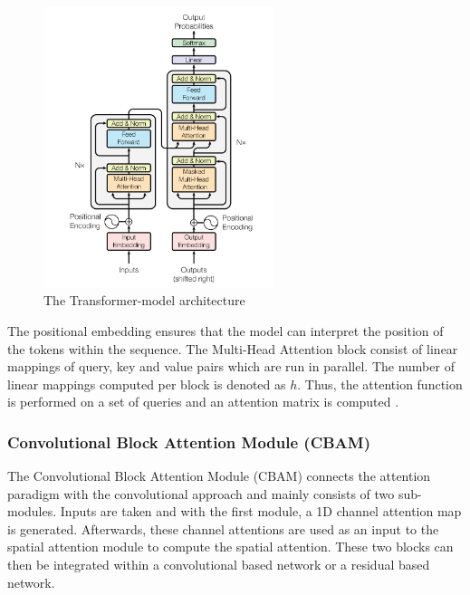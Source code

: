 \begin{figure}[H]
    \centering
    \includegraphics[width=0.6\textwidth]{Figures/Transformer.png}
    \caption{The Transformer-model architecture \cite{vaswani_attention_2023}}
    \label{fig:transformer_model}
\end{figure}

The positional embedding ensures that the model can interpret the position of the tokens within the sequence. The Multi-Head Attention block consist of linear mappings of query, key and value pairs which are run in parallel. The number of linear mappings computed per block is denoted as $h$. Thus, the attention function is performed on a set of queries and an attention matrix is computed \cite{vaswani_attention_2023}.

\subsubsection{Convolutional Block Attention Module (CBAM)}
The Convolutional Block Attention Module (CBAM) connects the attention paradigm with the convolutional approach and mainly consists of two sub-modules. Inputs are taken and with the first module, a 1D channel attention map is generated. Afterwards, these channel attentions are used as an input to the spatial attention module to compute the spatial attention. These two blocks can then be integrated within a convolutional based network or a residual based network.

